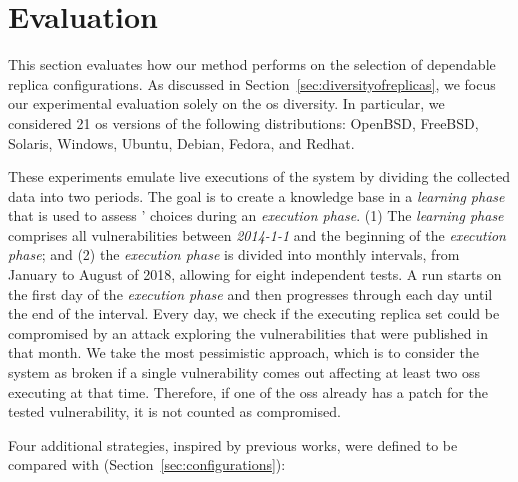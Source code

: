 \section{Evaluation}
\label{sec:diversity}


This section evaluates how our method performs on the selection of dependable replica configurations.
As discussed in Section~\ref{sec:diversityofreplicas}, we focus our experimental evaluation solely on the \gls{os} diversity.
In particular, we considered 21 \gls{os} versions 
of the following distributions: OpenBSD, FreeBSD, Solaris, Windows, Ubuntu, Debian, Fedora, and Redhat. 

These experiments emulate live executions of the system by dividing the collected data into two periods.
The goal is to create a knowledge base in a \emph{learning phase} that is used to assess \system' choices during an \emph{execution phase}.
(1) The \emph{learning phase} comprises all vulnerabilities between \emph{2014-1-1} and the beginning of the \emph{execution phase}; 
and (2) the \emph{execution phase} is divided into monthly intervals, from January to August of 2018, allowing for eight independent tests. 
A run starts on the first day of the \emph{execution phase} and then progresses through each day until the end of the interval. 
Every day, we check if the executing replica set could be compromised by an attack exploring the vulnerabilities that were published in that month. 
We take the most pessimistic approach, which is to consider the system as broken if a single vulnerability comes out affecting at least two \glspl{os} executing at that time.
Therefore, if one of the \glspl{os} already has a patch for the tested vulnerability, it is not counted as compromised.


Four additional strategies, inspired by previous works, were defined to be compared with \system (Section~\ref{sec:configurations}):

